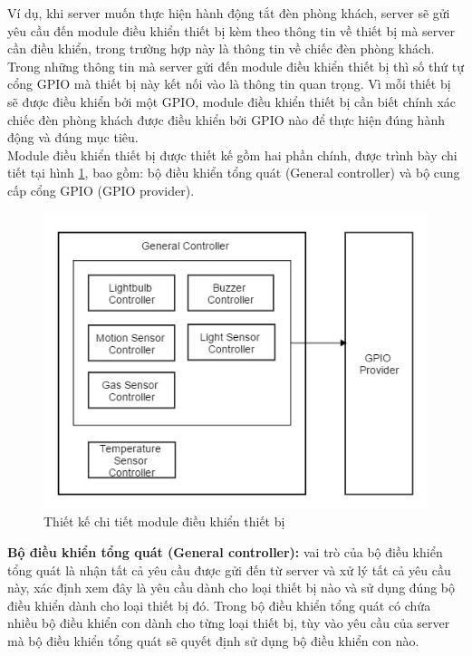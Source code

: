 \documentclass[12pt,a4paper,oneside]{extbook}
\begin{document}
\noindent
Ví dụ, khi server muốn thực hiện hành động tắt đèn phòng khách, server sẽ gửi yêu cầu đến module điều khiển thiết bị kèm theo thông tin về thiết bị mà server cần điều khiển, trong trường hợp này là thông tin về chiếc đèn phòng khách. Trong những thông tin mà server gửi đến module điều khiển thiết bị thì số thứ tự cổng GPIO mà thiết bị này kết nối vào là thông tin quan trọng. Vì mỗi thiết bị sẽ được điều khiển bởi một GPIO, module điều khiển thiết bị cần biết chính xác chiếc đèn phòng khách được điều khiển bởi GPIO nào để thực hiện đúng hành động và đúng mục tiêu.\\

\noindent
Module điều khiển thiết bị được thiết kế gồm hai phần chính, được trình bày chi tiết tại hình \ref{fig:4-module-dieu-khien-detail}, bao gồm: bộ điều khiển tổng quát (General controller) và bộ cung cấp cổng GPIO (GPIO provider).

\begin{figure}[h]
  \centering
     \includegraphics[scale=0.5]{4-module-dieu-khien-detail}
  \caption{Thiết kế chi tiết module điều khiển thiết bị}\label{fig:4-module-dieu-khien-detail}
\end{figure}

\noindent
\textbf{Bộ điều khiển tổng quát (General controller):} vai trò của bộ điều khiển tổng quát là nhận tất cả yêu cầu được gửi đến từ server và xử lý tất cả yêu cầu này, xác định xem đây là yêu cầu dành cho loại thiết bị nào và sử dụng đúng bộ điều khiển dành cho loại thiết bị đó. Trong bộ điều khiển tổng quát có chứa nhiều bộ điều khiển con dành cho từng loại thiết bị, tùy vào yêu cầu của server mà bộ điều khiển tổng quát sẽ quyết định sử dụng bộ điều khiển con nào. \\
\end{document}
